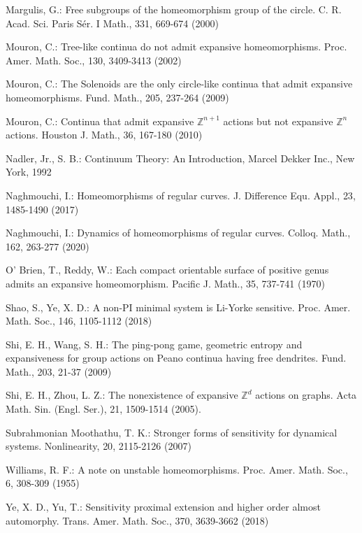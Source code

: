 \documentclass[12pt,a4paper]{amsart}
\theoremstyle{definition}
\numberwithin{equation}{section}
\begin{document}
\begin{thebibliography}{HD}
 Margulis, G.: Free subgroups of the homeomorphism group of the circle.  {C. R. Acad. Sci. Paris S\'er. I Math.},  {331}, 669-674 (2000)

 Mouron, C.: Tree-like continua do not admit expansive homeomorphisms.  {Proc. Amer. Math. Soc.},  {130}, 3409-3413 (2002)

 Mouron, C.: The Solenoids are the only circle-like continua that admit expansive homeomorphisms.  {Fund. Math.},  {205}, 237-264 (2009)

 Mouron, C.: Continua that admit expansive $\mathbb Z^{n+1}$ actions but not expansive $\mathbb Z^n$ actions.  {Houston J. Math.},  {36}, 167-180 (2010)

 Nadler, Jr., S. B.: Continuum Theory: An Introduction, Marcel Dekker Inc., New York, 1992

 Naghmouchi, I.: Homeomorphisms of regular curves.  {J. Difference Equ. Appl.},  {23}, 1485-1490 (2017)

 Naghmouchi, I.: Dynamics of homeomorphisms of regular curves.  {Colloq. Math.},  {162}, 263-277 (2020)

 O' Brien, T., Reddy, W.: Each compact orientable surface of positive genus admits an expansive homeomorphism.
 {Pacific J. Math.},  {35}, 737-741 (1970)

 Shao, S., Ye, X. D.: A non-PI minimal system is Li-Yorke sensitive.  {Proc. Amer. Math. Soc.},  {146},  1105-1112 (2018)

 Shi, E. H., Wang, S. H.: The ping-pong game, geometric entropy and expansiveness for group actions on Peano continua having free dendrites.  {Fund. Math.}, {203}, 21-37 (2009)

  Shi, E. H., Zhou, L. Z.:  The nonexistence of expansive $\mathbb Z^d$ actions on graphs.  {Acta Math. Sin. (Engl. Ser.)},  {21}, 1509-1514 (2005).

 Subrahmonian Moothathu, T. K.: Stronger forms of sensitivity for dynamical
systems.  {Nonlinearity},  {20}, 2115-2126 (2007)

 Williams, R. F.: A note on unstable homeomorphisms.  {Proc. Amer. Math. Soc.},  {6}, 308-309 (1955)

 Ye, X. D., Yu, T.: Sensitivity proximal extension and higher order almost automorphy.  {Trans. Amer. Math. Soc.},  {370}, 3639-3662 (2018)






\end{thebibliography}

\end{document}
